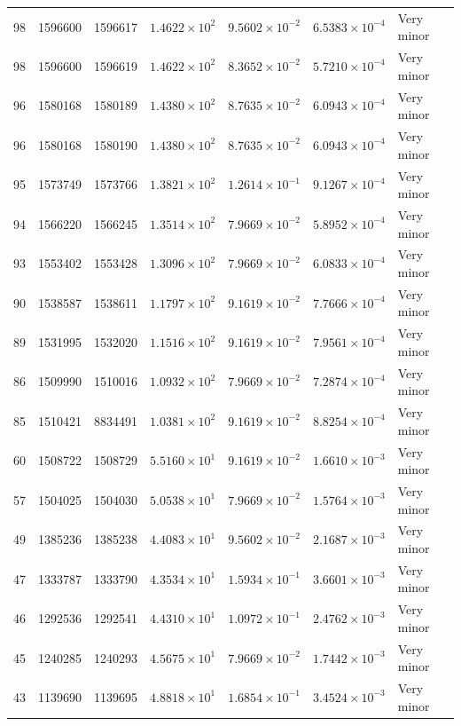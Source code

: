\documentclass[twocolumn]{openjournal}
\begin{document}
\begin{landscape}
\begin{longtable}{rrrrrrl}
98 & 1596600 & 1596617 & $1.4622\times10^{2}$ & $9.5602\times10^{-2}$ & $6.5383\times10^{-4}$ & Very minor \\
98 & 1596600 & 1596619 & $1.4622\times10^{2}$ & $8.3652\times10^{-2}$ & $5.7210\times10^{-4}$ & Very minor \\
96 & 1580168 & 1580189 & $1.4380\times10^{2}$ & $8.7635\times10^{-2}$ & $6.0943\times10^{-4}$ & Very minor \\
96 & 1580168 & 1580190 & $1.4380\times10^{2}$ & $8.7635\times10^{-2}$ & $6.0943\times10^{-4}$ & Very minor \\
95 & 1573749 & 1573766 & $1.3821\times10^{2}$ & $1.2614\times10^{-1}$ & $9.1267\times10^{-4}$ & Very minor \\
94 & 1566220 & 1566245 & $1.3514\times10^{2}$ & $7.9669\times10^{-2}$ & $5.8952\times10^{-4}$ & Very minor \\
93 & 1553402 & 1553428 & $1.3096\times10^{2}$ & $7.9669\times10^{-2}$ & $6.0833\times10^{-4}$ & Very minor \\
90 & 1538587 & 1538611 & $1.1797\times10^{2}$ & $9.1619\times10^{-2}$ & $7.7666\times10^{-4}$ & Very minor \\
89 & 1531995 & 1532020 & $1.1516\times10^{2}$ & $9.1619\times10^{-2}$ & $7.9561\times10^{-4}$ & Very minor \\
86 & 1509990 & 1510016 & $1.0932\times10^{2}$ & $7.9669\times10^{-2}$ & $7.2874\times10^{-4}$ & Very minor \\
85 & 1510421 & 8834491 & $1.0381\times10^{2}$ & $9.1619\times10^{-2}$ & $8.8254\times10^{-4}$ & Very minor \\
60 & 1508722 & 1508729 & $5.5160\times10^{1}$ & $9.1619\times10^{-2}$ & $1.6610\times10^{-3}$ & Very minor \\
57 & 1504025 & 1504030 & $5.0538\times10^{1}$ & $7.9669\times10^{-2}$ & $1.5764\times10^{-3}$ & Very minor \\
49 & 1385236 & 1385238 & $4.4083\times10^{1}$ & $9.5602\times10^{-2}$ & $2.1687\times10^{-3}$ & Very minor \\
47 & 1333787 & 1333790 & $4.3534\times10^{1}$ & $1.5934\times10^{-1}$ & $3.6601\times10^{-3}$ & Very minor \\
46 & 1292536 & 1292541 & $4.4310\times10^{1}$ & $1.0972\times10^{-1}$ & $2.4762\times10^{-3}$ & Very minor \\
45 & 1240285 & 1240293 & $4.5675\times10^{1}$ & $7.9669\times10^{-2}$ & $1.7442\times10^{-3}$ & Very minor \\
43 & 1139690 & 1139695 & $4.8818\times10^{1}$ & $1.6854\times10^{-1}$ & $3.4524\times10^{-3}$ & Very minor \\

\end{longtable}
\end{landscape}
\end{document}
